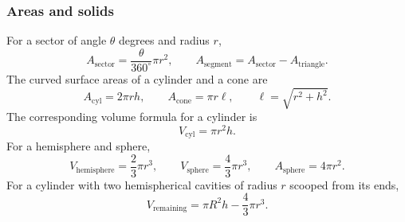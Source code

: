 \subsubsection*{Areas and solids}
For a sector of angle $\theta$ degrees and radius $r$,
\begin{equation}
A_{\mathrm{sector}}=\frac{\theta}{360^\circ}\pi r^2,\qquad
A_{\mathrm{segment}}=A_{\mathrm{sector}}-A_{\mathrm{triangle}}.
\label{eq:sector-segment}
\end{equation}
The curved surface areas of a cylinder and a cone are
\begin{equation}
A_{\mathrm{cyl}}=2\pi rh,\qquad A_{\mathrm{cone}}=\pi r\ell,\qquad \ell=\sqrt{r^2+h^2}.
\label{eq:cone-formula}
\end{equation}
The corresponding volume formula for a cylinder is
\begin{equation}
V_{\mathrm{cyl}}=\pi r^2h.
\label{eq:cylinder-formula}
\end{equation}
For a hemisphere and sphere,
\begin{equation}
V_{\mathrm{hemisphere}}=\frac23\pi r^3,\qquad V_{\mathrm{sphere}}=\frac43\pi r^3,
\qquad A_{\mathrm{sphere}}=4\pi r^2.
\label{eq:sphere-formula}
\end{equation}
For a cylinder with two hemispherical cavities of radius $r$ scooped from its ends,
\begin{equation}
V_{\mathrm{remaining}}=\pi R^2h-\frac43\pi r^3.
\label{eq:scooped-cylinder}
\end{equation}

